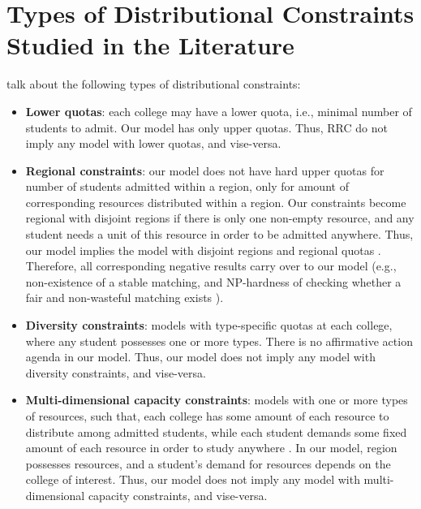 \appendix

\section{Types of Distributional Constraints Studied in the Literature}\label{app:constraints}

\citet{aziz22} talk about the following types of distributional constraints:

\begin{itemize}
    \item \textbf{Lower quotas}: each college may have a lower quota, i.e., minimal number of students to admit. Our model has only upper quotas. Thus, RRC do not imply any model with lower quotas, and vise-versa.

    \item \textbf{Regional constraints}: our model does not have hard upper quotas for number of students admitted within a region, only for amount of corresponding resources distributed within a region. Our constraints become regional with disjoint regions if there is only one non-empty resource, and any student needs a unit of this resource in order to be admitted anywhere. Thus, our model implies the model with disjoint regions and regional quotas \citep{kamada15}. Therefore, all corresponding negative results carry over to our model (e.g., non-existence of a stable matching, and NP-hardness of checking whether a fair and non-wasteful matching exists \citep{aziz24}).

    \item \textbf{Diversity constraints}: models with type-specific quotas at each college, where any student possesses one or more types. There is no affirmative action agenda in our model. Thus, our model does not imply any model with diversity constraints, and vise-versa.

    \item \textbf{Multi-dimensional capacity constraints}: models with one or more types of resources, such that, each college has some amount of each resource to distribute among admitted students, while each student demands some fixed amount of each resource in order to study anywhere \citep{delacretaz23,nguyen21}. In our model, region possesses resources, and a student's demand for resources depends on the college of interest. Thus, our model does not imply any model with multi-dimensional capacity constraints, and vise-versa.


\end{itemize}
